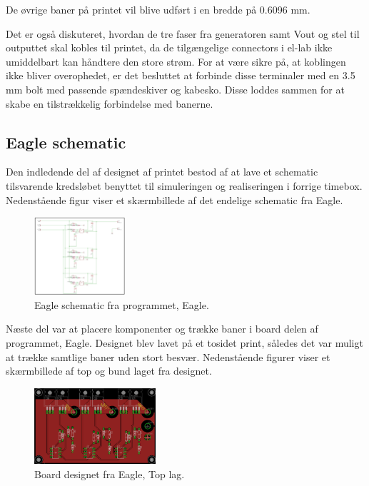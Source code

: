 De øvrige baner på printet vil blive udført i en bredde på 0.6096 mm. 

Det er også diskuteret, hvordan de tre faser fra generatoren samt Vout og stel til outputtet skal kobles til printet, da de tilgængelige connectors i el-lab ikke umiddelbart kan håndtere den store strøm. For at være sikre på, at koblingen ikke bliver overophedet, er det besluttet at forbinde disse terminaler med en 3.5 mm bolt med passende spændeskiver og kabesko. Disse loddes sammen for at skabe en tilstrækkelig forbindelse med banerne.

\subsection{Eagle schematic}
\label{sec:eagle-schematic}

Den indledende del af designet af printet bestod af at lave et schematic tilsvarende kredsløbet benyttet til simuleringen og realiseringen i forrige timebox. Nedenstående figur viser et skærmbillede af det endelige schematic fra Eagle.

\begin{figure}[h]
  \centering
  \includegraphics[width=0.3\textwidth]{dia3.png}
  \caption{Eagle schematic fra programmet, Eagle.}
  \label{fig:dia3}
\end{figure}
\clearpage
Næste del var at placere komponenter og trække baner i board delen af programmet, Eagle. Designet blev lavet på et tosidet print, således det var muligt at trække samtlige baner uden stort besvær. Nedenstående figurer viser et skærmbillede af top og bund laget fra designet. 

\begin{figure}[h]
  \centering
  \includegraphics[width=0.4\textwidth]{dia4.png}
  \caption{Board designet fra Eagle, Top lag.}
  \label{fig:dia4}
\end{figure}

